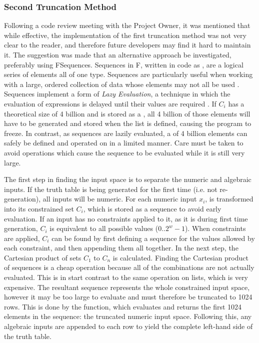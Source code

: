\subsubsection{Second Truncation Method}
Following a code review meeting with the Project Owner, it was mentioned that while effective, the implementation of the first truncation method was not very clear to the reader, and therefore future developers may find it hard to maintain it. The suggestion was made that an alternative approach be investigated, preferably using F\fsharp Sequences. Sequences in F\fsharp, written in code as , are a logical series of elements all of one type. Sequences are particularly useful when working with a large, ordered collection of data whose elements may not all be used \cite{sequences}. Sequences implement a form of \textit{Lazy Evaluation}, a technique in which the evaluation of expressions is delayed until their values are required \cite{lazyeval}. If $C_i$ has a theoretical size of 4 billion and is stored as a , all 4 billion of those elements will have to be generated and stored when the list is defined, causing the program to freeze. In contrast, as sequences are lazily evaluated, a  of 4 billion elements can safely be defined and operated on in a limited manner. Care must be taken to avoid operations which cause the sequence to be evaluated while it is still very large.

The first step in finding the input space is to separate the numeric and algebraic inputs. If the truth table is being generated for the first time (i.e. not re-generation), all inputs will be numeric. For each numeric input $x_i$, is transformed into its constrained set $C_i$, which is stored as a sequence to avoid early evaluation. If an input has no constraints applied to it, as it is during first time generation, $C_i$ is equivalent to all possible values ($0 .. 2^w -1$). When constraints are applied, $C_i$ can be found by first defining a sequence for the values allowed by each constraint, and then appending them all together. In the next step, the Cartesian product of sets $C_1$ to $C_n$ is calculated. Finding the Cartesian product of sequences is a cheap operation because all of the combinations are not actually evaluated. This is in start contrast to the same operation on lists, which is very expensive.
The resultant sequence represents the whole constrained input space, however it may be too large to evaluate and must therefore be truncated to 1024 rows. This is done by the  function, which evaluates and returns the first 1024 elements in the sequence: the truncated numeric input space. Following this, any algebraic inputs are appended to each row to yield the complete left-hand side of the truth table.

